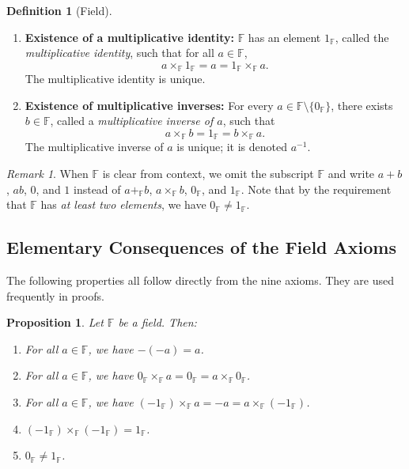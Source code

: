 \documentclass[11pt, a4paper, notitlepage]{report}
\newtheorem{proposition}[theorem]{Proposition}
\theoremstyle{definition}
\newtheorem{definition}[theorem]{Definition}
\theoremstyle{remark}
\newtheorem{remark}[theorem]{Remark}
\begin{document}
\begin{definition}[Field]
\begin{enumerate}
  \item \textbf{Existence of a multiplicative identity:} $\mathbb{F}$ has an element $1_{\mathbb{F}}$, called the \emph{multiplicative identity}, such that for all $a \in \mathbb{F}$,
    \[ a \times_{\mathbb{F}} 1_{\mathbb{F}} = a = 1_{\mathbb{F}} \times_{\mathbb{F}} a. \]
    The multiplicative identity is unique.
  \item \textbf{Existence of multiplicative inverses:} For every $a \in \mathbb{F} \setminus \{0_{\mathbb{F}}\}$, there exists $b \in \mathbb{F}$, called a \emph{multiplicative inverse of $a$}, such that
    \[ a \times_{\mathbb{F}} b = 1_{\mathbb{F}} = b \times_{\mathbb{F}} a. \]
    The multiplicative inverse of $a$ is unique; it is denoted $a^{-1}$.
\end{enumerate}
\end{definition}

\begin{remark}
When $\mathbb{F}$ is clear from context, we omit the subscript $\mathbb{F}$ and write $a + b$, $ab$, $0$, and $1$ instead of $a +_\mathbb{F} b$, $a \times_\mathbb{F} b$, $0_\mathbb{F}$, and $1_\mathbb{F}$. Note that by the requirement that $\mathbb{F}$ has \emph{at least two elements}, we have $0_\mathbb{F} \neq 1_\mathbb{F}$.
\end{remark}

\subsection{Elementary Consequences of the Field Axioms}

The following properties all follow directly from the nine axioms. They are used frequently in proofs.

\begin{proposition}\label{prop:field-consequences}
Let $\mathbb{F}$ be a field. Then:
\begin{enumerate}
  \item For all $a \in \mathbb{F}$, we have $-(-a) = a$.
  \item For all $a \in \mathbb{F}$, we have $0_\mathbb{F} \times_\mathbb{F} a = 0_\mathbb{F} = a \times_\mathbb{F} 0_\mathbb{F}$.
  \item For all $a \in \mathbb{F}$, we have $(-1_\mathbb{F}) \times_\mathbb{F} a = -a = a \times_\mathbb{F} (-1_\mathbb{F})$.
  \item $(-1_\mathbb{F}) \times_\mathbb{F} (-1_\mathbb{F}) = 1_\mathbb{F}$.
  \item $0_\mathbb{F} \neq 1_\mathbb{F}$.
\end{enumerate}
\end{proposition}
\end{document}
